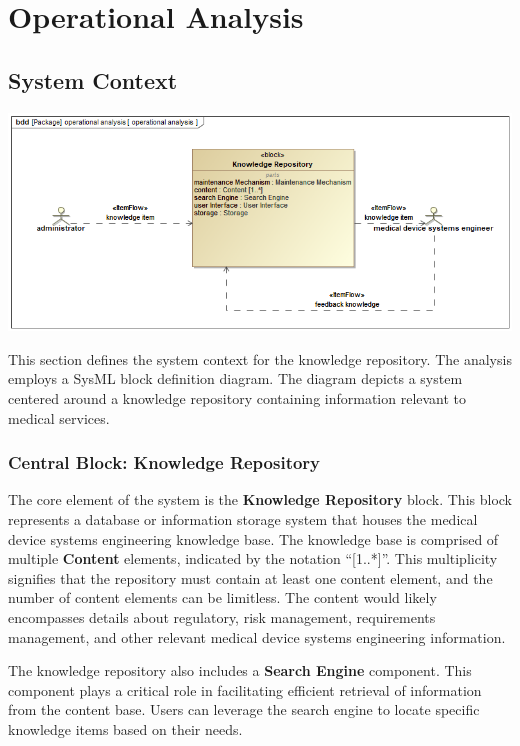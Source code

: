 \documentclass[
  letterpaper,
  DIV=11,
  numbers=noendperiod]{scrreprt}
\begin{document}

\chapter{Operational Analysis}\label{operational-analysis}

\section{System Context}\label{system-context}

\includegraphics{images/paste-3.png}

This section defines the system context for the knowledge repository.
The analysis employs a SysML block definition diagram. The diagram
depicts a system centered around a knowledge repository containing
information relevant to medical services.

\subsection{Central Block: Knowledge
Repository}\label{central-block-knowledge-repository}

The core element of the system is the \textbf{Knowledge Repository}
block. This block represents a database or information storage system
that houses the medical device systems engineering knowledge base. The
knowledge base is comprised of multiple \textbf{Content} elements,
indicated by the notation ``{[}1..*{]}''. This multiplicity signifies
that the repository must contain at least one content element, and the
number of content elements can be limitless. The content would likely
encompasses details about regulatory, risk management, requirements
management, and other relevant medical device systems engineering
information.

The knowledge repository also includes a \textbf{Search Engine}
component. This component plays a critical role in facilitating
efficient retrieval of information from the content base. Users can
leverage the search engine to locate specific knowledge items based on
their needs.
\end{document}
